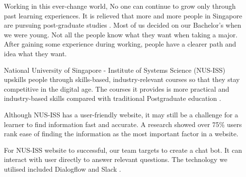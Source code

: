 Working in this ever-change world, No one can continue to grow only through past learning experiences. It is relieved that more and more people in Singapore are pursuing post-graduate studies \cite{postgrad}. Most of us decided on our Bachelor’s when we were young. Not all the people know what they want when taking a major. After gaining some experience during working, people have a clearer path and idea what they want.

National University of Singapore - Institute of Systems Science (NUS-ISS) upskills people through skills-based, industry-relevant courses so that they stay competitive in the digital age. The courses it provides is more practical and industry-based skills compared with traditional Postgraduate education \cite{nusiss}.

Although NUS-ISS has a user-friendly website, it may still be a challenge for a learner to find information fast and accurate. A research \cite{websiteuser} showed over 75\% users rank ease of finding the information as the most important factor in a website.

For NUS-ISS website to successful, our team targets to create a chat bot. It can interact with user directly to answer relevant questions. The technology we utilised included Dialogflow \cite{dialogflow} and Slack \cite{slack}.